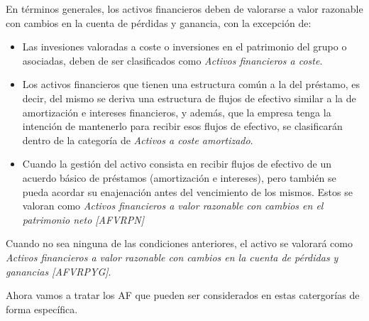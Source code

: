 En términos generales, los activos financieros deben de valorarse a valor razonable con cambios en la cuenta de pérdidas y ganancia, con la excepción de:
\begin{itemize}
    \item Las invesiones valoradas a coste o inversiones en el patrimonio del grupo o asociadas, deben de ser clasificados como \textit{Activos financieros a coste}.
    \item Los activos financieros que tienen una estructura común a la del préstamo, es decir, del mismo se deriva una estructura de flujos de efectivo similar a la de amortización e intereses financieros, y además, que la empresa tenga la intención de mantenerlo para recibir esos flujos de efectivo, se clasificarán dentro de la categoría de \textit{Activos a coste amortizado}.
    \item Cuando la gestión del activo consista en recibir flujos de efectivo de un acuerdo básico de préstamos (amortización e intereses), pero también se pueda acordar su enajenación antes del vencimiento de los mismos. Estos se valoran como \textit{Activos financieros a valor razonable con cambios en el patrimonio neto [AFVRPN]}
\end{itemize}

Cuando no sea ninguna de las condiciones anteriores, el activo se valorará como \textit{Activos financieros a valor razonable con cambios en la cuenta de pérdidas y ganancias [AFVRPYG]}.

Ahora vamos a tratar los AF que pueden ser considerados en estas catergorías de forma específica.

